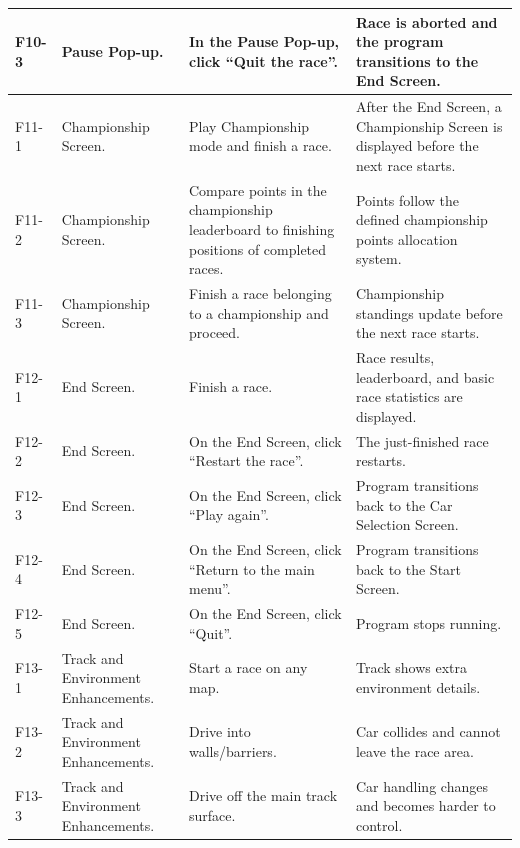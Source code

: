 \documentclass[12pt]{article}
\begin{document}
\begin{longtable}{|l|p{}|p{}|p{}|}
F10-3 & Pause Pop-up. &
In the Pause Pop-up, click “Quit the race”. &
Race is aborted and the program transitions to the End Screen. \\
\hline

F11-1 & Championship Screen. &
Play Championship mode and finish a race. &
After the End Screen, a Championship Screen is displayed before the next race starts. \\
\hline

F11-2 & Championship Screen. &
Compare points in the championship leaderboard to finishing positions of completed races. &
Points follow the defined championship points allocation system. \\
\hline

F11-3 & Championship Screen. &
Finish a race belonging to a championship and proceed. &
Championship standings update before the next race starts. \\
\hline

F12-1 & End Screen. &
Finish a race. &
Race results, leaderboard, and basic race statistics are displayed. \\
\hline

F12-2 & End Screen. &
On the End Screen, click “Restart the race”. &
The just-finished race restarts. \\
\hline

F12-3 & End Screen. &
On the End Screen, click “Play again”. &
Program transitions back to the Car Selection Screen. \\
\hline

F12-4 & End Screen. &
On the End Screen, click “Return to the main menu”. &
Program transitions back to the Start Screen. \\
\hline

F12-5 & End Screen. &
On the End Screen, click “Quit”. &
Program stops running. \\
\hline

F13-1 & Track and Environment Enhancements. &
Start a race on any map. &
Track shows extra environment details. \\
\hline

F13-2 & Track and Environment Enhancements. &
Drive into walls/barriers. &
Car collides and cannot leave the race area. \\
\hline

F13-3 & Track and Environment Enhancements. &
Drive off the main track surface. &
Car handling changes and becomes harder to control. \\
\hline


\end{longtable}
\end{document}
